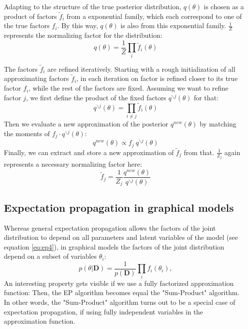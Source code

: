 \documentclass{sigkdd}
\begin{document}
Adapting to the structure of the true posterior distribution, $q(\theta)$ is chosen as a product of factors $\tilde{f}_i$ from a exponential family, which each correspond to one of the true factors $f_i$. By this way, $q(\theta)$ is also from this exponential family. $\frac{1}{Z}$ represents the normalizing factor for the distribution:
\begin{equation}\label{eq:ep6}
q(\theta) = \frac{1}{Z}\prod_i \tilde{f}_i(\theta)
\end{equation}

The factors $\tilde{f}_i$ are refined iteratively. Starting with a rough initialization of all approximating factors $\tilde{f}_i$, in each iteration on factor is refined closer to its true factor $f_i$, while the rest of the factors are fixed. Assuming we want to refine factor $j$, we first define the product of the fixed factors $q^{\backslash j}(\theta)$ for that:
\begin{equation}\label{eq:ep7}
q^{\backslash j}(\theta) = \prod_{i\ne j} \tilde{f}_i(\theta)
\end{equation}
Then we evaluate a new approximation of the posterior $q^{new}(\theta)$ by matching the moments of $f_j \cdot q^{\backslash j}(\theta)$:
\begin{equation}\label{eq:ep7.1}
q^{new}(\theta) \propto f_j ~ q^{\backslash j}(\theta)
\end{equation}
Finally, we can extract and store a new approximation of $\tilde{f}_j$ from that. $\frac{1}{Z_j}$ again represents a necessary normalizing factor here:
\begin{equation}\label{eq:ep8}
\tilde{f}_j = \frac{1}{Z_j} \frac{q^{new}(\theta)}{q^{\backslash j}(\theta)}
\end{equation}

\subsection{Expectation propagation in graphical models}
Whereas general expectation propagation allows the factors of the joint distribution to depend on all parameters and latent variables of the model (see equation \ref{eq:ep4}), in graphical models the factors of the joint distribution depend on a subset of variables $\theta_i$:
\begin{equation}\label{eq:ep9}
p(\theta|\mathbf{D}) = \frac{1}{p(\mathbf{D})} \prod_i f_i(\theta_i),
\end{equation}
An interesting property gets visible if we use a fully factorized approximation function: Then, the EP algorithm becomes equal the "Sum-Product" algorithm. In other words, the "Sum-Product" algorithm turns out to be a special case of expectation propagation, if using fully independent variables in the approximation function.
\end{document}
